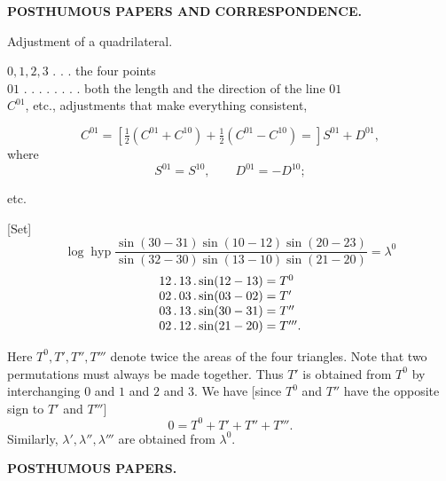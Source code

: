 \par\clearpage

\null\thispagestyle{empty}

\par\clearpage

\thispagestyle{empty}
\vspace*{3\baselineskip}
{\centering\Large\bfseries POSTHUMOUS PAPERS AND CORRESPONDENCE.\par}
\vspace{3\baselineskip}
{\centering
[1.]\par\smallskip
Adjustment of a quadrilateral.\par}
\begin{flushleft}
\hspace*{1.8em}\(0,1,2,3\) . . . the four points\\
\hspace*{1.8em}\(01\) . . . . . . . . both the length and the direction of the line \(01\)\\
\hspace*{1.8em}\(C^{01}\), etc., adjustments that make everything consistent,
\end{flushleft}
\[
 C^{01}=\left[\tfrac12(C^{01}+C^{10})+\tfrac12(C^{01}-C^{10})=\right]S^{01}+D^{01},
\]
\noindent where
\[
 S^{01}=S^{10},\qquad D^{01}=-D^{10};
\]
{\centering etc.\par}

[Set]
\[
 \log\operatorname{hyp}
 \frac{\sin(30-31)\sin(10-12)\sin(20-23)}
      {\sin(32-30)\sin(13-10)\sin(21-20)}
 =\lambda^0
\]
\[
\begin{array}{@{}r@{\;=\;}l@{}}
 12\,.\,13\,.\sin(12-13)&T^0\\
 02\,.\,03\,.\sin(03-02)&T'\\
 03\,.\,13\,.\sin(30-31)&T''\\
 02\,.\,12\,.\sin(21-20)&T'''.
\end{array}
\]

Here \(T^0,T',T'',T'''\) denote twice the areas of the four triangles. Note that two permutations must always be made together. Thus \(T'\) is obtained from \(T^0\) by interchanging \(0\) and \(1\) and \(2\) and \(3\). We have [since \(T^0\) and \(T''\) have the opposite sign to \(T'\) and \(T'''\)]
\[
 0=T^0+T'+T''+T'''.
\]
Similarly, \(\lambda',\lambda'',\lambda'''\) are obtained from \(\lambda^0\).

\par\clearpage
\noindent{}\hfill{\small\textbf{POSTHUMOUS PAPERS.}}\hfill\null\par\medskip


